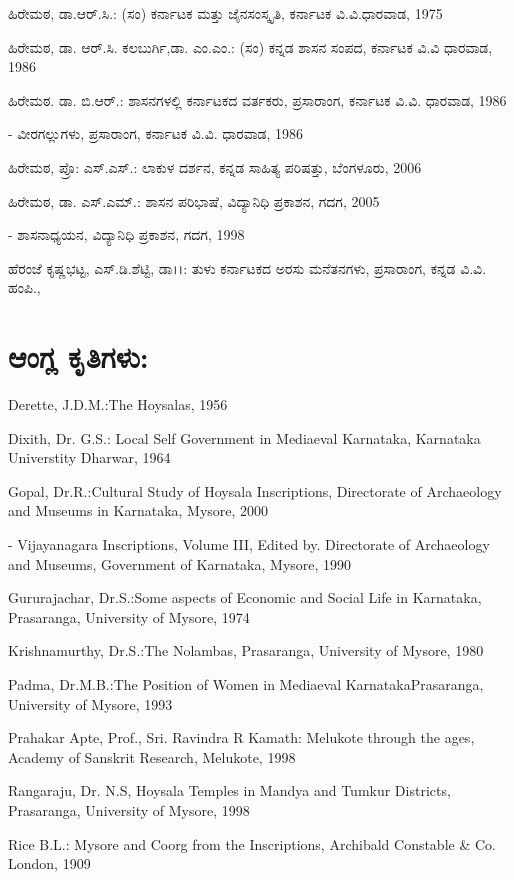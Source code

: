 \noindent
ಹಿರೇಮಠ, ಡಾ.ಆರ್​.ಸಿ.: (ಸಂ) ಕರ್ನಾಟಕ ಮತ್ತು ಜೈನಸಂಸ್ಕೃತಿ, ಕರ್ನಾಟಕ ವಿ.ವಿ.ಧಾರವಾಡ, 1975

\noindent
ಹಿರೇಮಠ, ಡಾ. ಆರ್​.ಸಿ. ಕಲಬುರ್ಗಿ,ಡಾ. ಎಂ.ಎಂ.: (ಸಂ) ಕನ್ನಡ ಶಾಸನ ಸಂಪದ, ಕರ್ನಾಟಕ ವಿ.ವಿ ಧಾರವಾಡ, 1986

\noindent
ಹಿರೇಮಠ. ಡಾ. ಬಿ.ಆರ್​.: ಶಾಸನಗಳಲ್ಲಿ ಕರ್ನಾಟಕದ ವರ್ತಕರು, ಪ್ರಸಾರಾಂಗ, ಕರ್ನಾಟಕ ವಿ.ವಿ. ಧಾರವಾಡ, 1986

- ವೀರಗಲ್ಲುಗಳು, ಪ್ರಸಾರಾಂಗ, ಕರ್ನಾಟಕ ವಿ.ವಿ. ಧಾರವಾಡ, 1986

\noindent
ಹಿರೇಮಠ, ಪ್ರೊ: ಎಸ್​.ಎಸ್​.: ಲಾಕುಳ ದರ್ಶನ, ಕನ್ನಡ ಸಾಹಿತ್ಯ ಪರಿಷತ್ತು, ಬೆಂಗಳೂರು, 2006

\noindent
ಹಿರೇಮಠ, ಡಾ. ಎಸ್​.ಎಮ್.: ಶಾಸನ ಪರಿಭಾಷೆ, ವಿದ್ಯಾನಿಧಿ ಪ್ರಕಾಶನ, ಗದಗ, 2005

- ಶಾಸನಾಧ್ಯಯನ, ವಿದ್ಯಾನಿಧಿ ಪ್ರಕಾಶನ, ಗದಗ, 1998

\noindent
ಹೆರಂಜೆ ಕೃಷ್ಣಭಟ್ಟ, ಎಸ್​.ಡಿ.ಶೆಟ್ಟಿ, ಡಾ।।: ತುಳು ಕರ್ನಾಟಕದ ಅರಸು ಮನೆತನಗಳು, ಪ್ರಸಾರಾಂಗ, ಕನ್ನಡ ವಿ.ವಿ. ಹಂಪಿ.,


\section{ಆಂಗ್ಲ ಕೃತಿಗಳು:}

\noindent
Derette, J.D.M.:The Hoysalas, 1956

\noindent
Dixith, Dr. G.S.: Local Self Government in Mediaeval Karnataka, Karnataka Universtity Dharwar, 1964

\noindent
Gopal, Dr.R.:Cultural Study of Hoysala Inscriptions, Directorate of Archaeology and Museums in Karnataka, Mysore, 2000

- Vijayanagara Inscriptions, Volume III, Edited by. Directorate of Archaeology and Museums, Government of Karnataka, Mysore, 1990

\noindent
Gururajachar, Dr.S.:Some aspects of Economic and Social Life in Karnataka, Prasaranga, University of Mysore, 1974

\noindent
Krishnamurthy, Dr.S.:The Nolambas, Prasaranga, University of Mysore, 1980

\noindent
Padma, Dr.M.B.:The Position of Women in Mediaeval KarnatakaPrasaranga, University of Mysore, 1993

\noindent
Prahakar Apte, Prof., Sri. Ravindra R Kamath: Melukote through the ages, Academy of Sanskrit Research, Melukote, 1998

\noindent
Rangaraju, Dr. N.S, Hoysala Temples in Mandya and Tumkur Districts, Prasaranga, University of Mysore, 1998

\noindent
Rice B.L.: Mysore and Coorg from the Inscriptions, Archibald Constable \& Co. London, 1909

